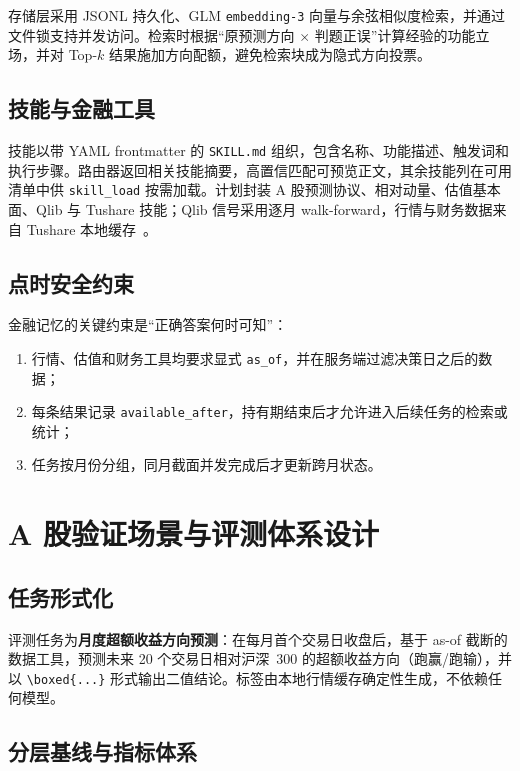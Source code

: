 \documentclass[11pt]{article}
\begin{document}
存储层采用 JSONL 持久化、GLM \texttt{embedding-3} 向量与余弦相似度检索，并通过文件锁支持并发访问。检索时根据“原预测方向 $\times$ 判题正误”计算经验的功能立场，并对 Top-$k$ 结果施加方向配额，避免检索块成为隐式方向投票。

\subsection{技能与金融工具}

技能以带 YAML frontmatter 的 \texttt{SKILL.md} 组织，包含名称、功能描述、触发词和执行步骤。路由器返回相关技能摘要，高置信匹配可预览正文，其余技能列在可用清单中供 \texttt{skill\_load} 按需加载。计划封装 A 股预测协议、相对动量、估值基本面、Qlib 与 Tushare 技能；Qlib 信号采用逐月 walk-forward，行情与财务数据来自 Tushare 本地缓存~\citep{qlib2020,tushare}。

\subsection{点时安全约束}

金融记忆的关键约束是“正确答案何时可知”：
\begin{enumerate}
    \item 行情、估值和财务工具均要求显式 \texttt{as\_of}，并在服务端过滤决策日之后的数据；
    \item 每条结果记录 \texttt{available\_after}，持有期结束后才允许进入后续任务的检索或统计；
    \item 任务按月份分组，同月截面并发完成后才更新跨月状态。
\end{enumerate}

\section{A 股验证场景与评测体系设计}

\subsection{任务形式化}

评测任务为\textbf{月度超额收益方向预测}：在每月首个交易日收盘后，基于 as-of 截断的数据工具，预测未来 20 个交易日相对沪深~300 的超额收益方向（跑赢/跑输），并以 \texttt{\textbackslash boxed\{...\}} 形式输出二值结论。标签由本地行情缓存确定性生成，不依赖任何模型。

\subsection{分层基线与指标体系}
\end{document}
